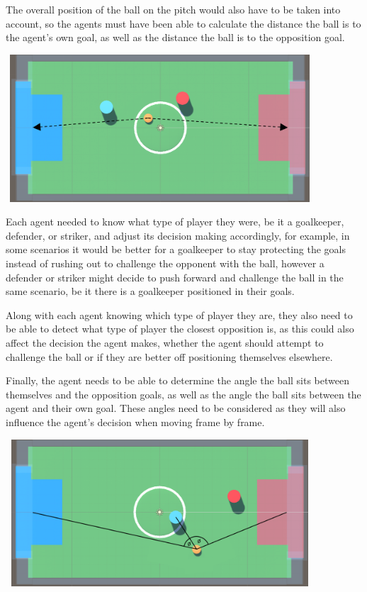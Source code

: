 \begin{flushleft}
The overall position of the ball on the pitch would also have to be taken into account, so the agents must have been able to calculate the distance the ball is to the agent's own goal, as well as the distance the ball is to the opposition goal. 
\end{flushleft}

\vspace{8mm}
\centering
\includegraphics[width=115mm, height=55mm]{img/Image3.png}
\vspace{8mm}

\begin{flushleft}
Each agent needed to know what type of player they were, be it a goalkeeper, defender, or striker, and adjust its decision making accordingly, for example, in some scenarios it would be better for a goalkeeper to stay protecting the goals instead of rushing out to challenge the opponent with the ball, however a defender or striker might decide to push forward and challenge the ball in the same scenario, be it there is a goalkeeper positioned in their goals.

Along with each agent knowing which type of player they are, they also need to be able to detect what type of player the closest opposition is, as this could also affect the decision the agent makes, whether the agent should attempt to challenge the ball or if they are better off positioning themselves elsewhere.

Finally, the agent needs to be able to determine the angle the ball sits between themselves and the opposition goals, as well as the angle the ball sits between the agent and their own goal. These angles need to be considered as they will also influence the agent’s decision when moving frame by frame.
\end{flushleft}

\vspace{8mm}
\centering
\includegraphics[width=115mm, height=55mm]{img/Image5.png}
\vspace{8mm}

